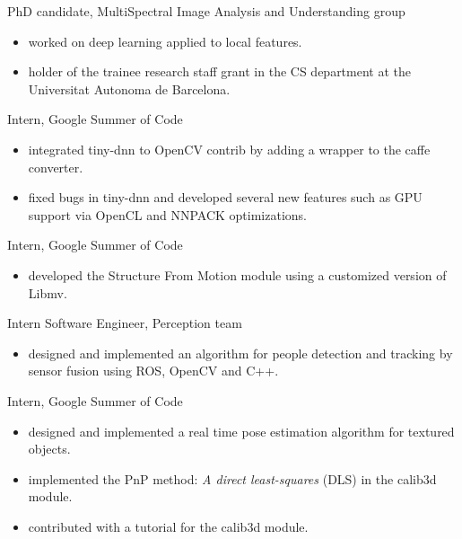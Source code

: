 \documentclass{article}
\begin{document}
\begin{llist}
PhD candidate, MultiSpectral Image Analysis and Understanding group
\vspace{-0.33cm}
\begin{itemize}
 \item worked on deep learning applied to local features.
 \item holder of the trainee research staff grant in the CS department at the Universitat Autonoma de Barcelona.
\end{itemize}

Intern, Google Summer of Code
\vspace{-0.33cm}
\begin{itemize}
 \item integrated tiny-dnn to OpenCV contrib by adding a wrapper to the caffe converter.
 \item fixed bugs in tiny-dnn and developed several new features such as GPU support via OpenCL and NNPACK optimizations.
\end{itemize}

Intern, Google Summer of Code
\vspace{-0.33cm}
\begin{itemize}
 \item developed the Structure From Motion module using a customized version of Libmv.
\end{itemize}

Intern Software Engineer, Perception team
\vspace{-0.33cm}
\begin{itemize}
 \item designed and implemented an algorithm for people detection and tracking by sensor fusion using ROS, OpenCV and C++.
\end{itemize}

Intern, Google Summer of Code
\vspace{-0.33cm}
\begin{itemize}
 \item designed and implemented a real time pose estimation algorithm for textured objects.
 \item implemented the PnP method: \textit{A direct least-squares} (DLS) in the calib3d module.
 \item contributed with a tutorial for the calib3d module.
\end{itemize}


\end{llist}
\end{document}
